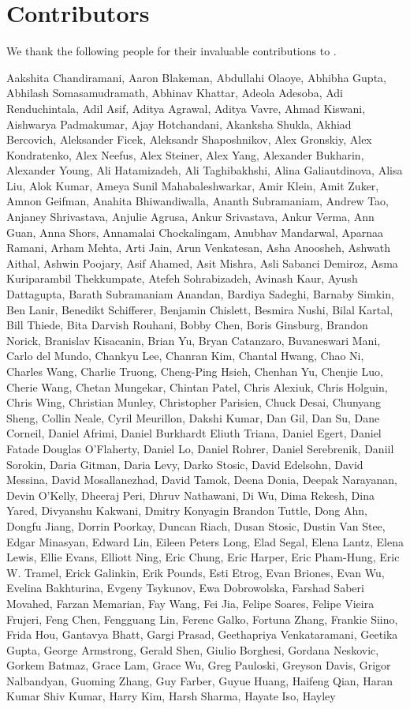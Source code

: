 \section*{Contributors}

We thank the following people for their invaluable contributions to \ourmodelfull.

Aakshita Chandiramani, Aaron Blakeman, Abdullahi Olaoye, Abhibha Gupta, Abhilash Somasamudramath, Abhinav Khattar, Adeola Adesoba, Adi Renduchintala, Adil Asif, Aditya Agrawal, Aditya Vavre, Ahmad Kiswani, Aishwarya Padmakumar, Ajay Hotchandani, Akanksha Shukla, Akhiad Bercovich, Aleksander Ficek, Aleksandr Shaposhnikov, Alex Gronskiy, Alex Kondratenko, Alex Neefus, Alex Steiner, Alex Yang, Alexander Bukharin, Alexander Young, Ali Hatamizadeh, Ali Taghibakhshi, Alina Galiautdinova, Alisa Liu, Alok Kumar, Ameya Sunil Mahabaleshwarkar, Amir Klein, Amit Zuker, Amnon Geifman, Anahita Bhiwandiwalla, Ananth Subramaniam, Andrew Tao, Anjaney Shrivastava, Anjulie Agrusa, Ankur Srivastava, Ankur Verma, Ann Guan, Anna Shors, Annamalai Chockalingam, Anubhav Mandarwal, Aparnaa Ramani, Arham Mehta, Arti Jain, Arun Venkatesan, Asha Anoosheh, Ashwath Aithal, Ashwin Poojary, Asif Ahamed, Asit Mishra, Asli Sabanci Demiroz, Asma Kuriparambil Thekkumpate, Atefeh Sohrabizadeh, Avinash Kaur, Ayush Dattagupta, Barath Subramaniam Anandan, Bardiya Sadeghi, Barnaby Simkin, Ben Lanir, Benedikt Schifferer, Benjamin Chislett, Besmira Nushi, Bilal Kartal, Bill Thiede, Bita Darvish Rouhani, Bobby Chen, Boris Ginsburg, Brandon Norick, Branislav Kisacanin, Brian Yu, Bryan Catanzaro, Buvaneswari Mani, Carlo del Mundo, Chankyu Lee, Chanran Kim, Chantal Hwang, Chao Ni, Charles Wang, Charlie Truong, Cheng-Ping Hsieh, Chenhan Yu, Chenjie Luo, Cherie Wang, Chetan Mungekar, Chintan Patel, Chris Alexiuk, Chris Holguin, Chris Wing, Christian Munley, Christopher Parisien, Chuck Desai, Chunyang Sheng, Collin Neale, Cyril Meurillon, Dakshi Kumar, Dan Gil, Dan Su, Dane Corneil, Daniel Afrimi, Daniel Burkhardt Eliuth Triana, Daniel Egert, Daniel Fatade Douglas O'Flaherty, Daniel Lo, Daniel Rohrer, Daniel Serebrenik, Daniil Sorokin, Daria Gitman, Daria Levy, Darko Stosic, David Edelsohn, David Messina, David Mosallanezhad, David Tamok, Deena Donia, Deepak Narayanan, Devin O’Kelly, Dheeraj Peri, Dhruv Nathawani, Di Wu, Dima Rekesh, Dina Yared, Divyanshu Kakwani, Dmitry Konyagin Brandon Tuttle, Dong Ahn, Dongfu Jiang, Dorrin Poorkay, Duncan Riach, Dusan Stosic, Dustin Van Stee, Edgar Minasyan, Edward Lin, Eileen Peters Long, Elad Segal, Elena Lantz, Elena Lewis, Ellie Evans, Elliott Ning, Eric Chung, Eric Harper, Eric Pham-Hung, Eric W. Tramel, Erick Galinkin, Erik Pounds, Esti Etrog, Evan Briones, Evan Wu, Evelina Bakhturina, Evgeny Tsykunov, Ewa Dobrowolska, Farshad Saberi Movahed, Farzan Memarian, Fay Wang, Fei Jia, Felipe Soares, Felipe Vieira Frujeri, Feng Chen, Fengguang Lin, Ferenc Galko, Fortuna Zhang, Frankie Siino, Frida Hou, Gantavya Bhatt, Gargi Prasad, Geethapriya Venkataramani, Geetika Gupta, George Armstrong, Gerald Shen, Giulio Borghesi, Gordana Neskovic, Gorkem Batmaz, Grace Lam, Grace Wu, Greg Pauloski, Greyson Davis, Grigor Nalbandyan, Guoming Zhang, Guy Farber, Guyue Huang, Haifeng Qian, Haran Kumar Shiv Kumar, Harry Kim, Harsh Sharma, Hayate Iso, Hayley 